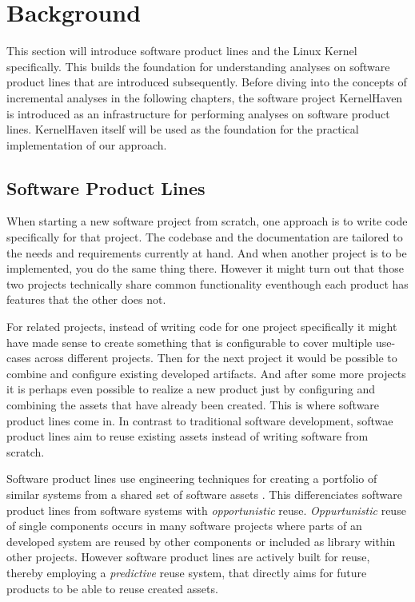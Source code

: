 \documentclass[a4paper]{article}
\begin{document}
\section{Background} \label{background}

This section will introduce software product lines and the Linux Kernel  specifically. This builds the foundation for understanding analyses on software product lines that are introduced subsequently. Before diving into the concepts of incremental analyses in the following chapters, the software project KernelHaven is introduced as an infrastructure for performing analyses on software product lines. KernelHaven itself will be used as the foundation for the practical implementation of our approach.

\subsection{Software Product Lines}\label{spl}

When starting a new software project from scratch, one approach is to write code specifically for that project. The codebase and the documentation are tailored to the needs and requirements currently at hand. And when another project is to be implemented, you do the same thing there. However it might turn out that those two projects technically share common functionality eventhough each product has features that the other does not.

For related projects, instead of writing code for one project specifically it might have made sense to create something that is configurable to cover multiple use-cases across different projects. Then for the next project it would be possible to combine and configure existing developed artifacts. And after some more projects it is perhaps even possible to realize a new product just by configuring and combining the assets that have already been created. This is where software product lines come in. In contrast to traditional software development, softwae product lines aim to reuse existing assets instead of writing software from scratch.

Software product lines use engineering techniques for creating a portfolio of similar systems from a shared set of software assets \cite{intro-spl}. This differenciates software product lines from software systems with \emph{opportunistic} reuse. \emph{Oppurtunistic} reuse of single components occurs in many software projects where parts of an developed system are reused by other components or included as library within other projects. However software product lines are actively built for reuse, thereby employing a \emph{predictive} reuse system, that directly aims for future products to be able to reuse created assets.
\end{document}
